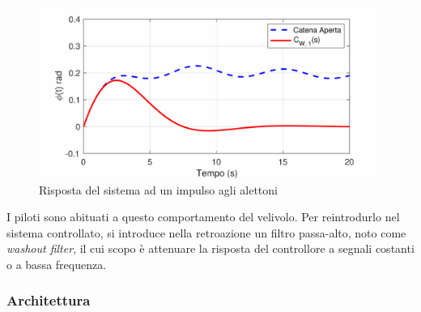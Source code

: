 \begin{figure}[H]
    \centering
    \includegraphics[width=0.7\linewidth]{Immagini/effetto_negativo_retroazione.pdf}
    \caption{Risposta del sistema ad un impulso agli alettoni}
\end{figure}

I piloti sono abituati a questo comportamento del velivolo. Per reintrodurlo nel sistema controllato, si introduce nella retroazione un filtro passa-alto, noto come \textit{washout filter}, il cui scopo è attenuare la risposta del controllore a segnali costanti o a bassa frequenza.

\subsubsection{Architettura}

